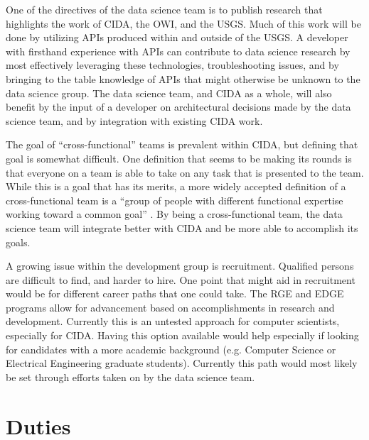 \documentclass[twocolumn]{article}
\begin{document}
\par
One of the directives of the data science team is to publish research that highlights the work of CIDA, the OWI, and the USGS.
Much of this work will be done by utilizing APIs produced within and outside of the USGS.
A developer with firsthand experience with APIs can contribute to data science research by most effectively leveraging these technologies, troubleshooting issues, and by bringing to the table knowledge of APIs that might otherwise be unknown to the data science group. The data science team, and CIDA as a whole, will also benefit by the input of a developer on architectural decisions made by the data science team, and by integration with existing CIDA work. 

\par
The goal of ``cross-functional'' teams is prevalent within CIDA, but defining that goal is somewhat difficult.
One definition that seems to be making its rounds is that everyone on a team is able to take on any task that is presented to the team.
While this is a goal that has its merits, a more widely accepted definition of a cross-functional team is a ``group of people with different functional expertise working toward a common goal'' \cite{wiki:crossfunctional}.
By being a cross-functional team, the data science team will integrate better with CIDA and be more able to accomplish its goals.

\par
A growing issue within the development group is recruitment.
Qualified persons are difficult to find, and harder to hire.
One point that might aid in recruitment would be for different career paths that one could take.
The RGE and EDGE \cite{rge} programs allow for advancement based on accomplishments in research and development.
Currently this is an untested approach for computer scientists, especially for CIDA.
Having this option available would help especially if looking for candidates with a more academic background (e.g. Computer Science or Electrical Engineering graduate students).
Currently this path would most likely be set through efforts taken on by the data science team.

\section{Duties}
\end{document}
